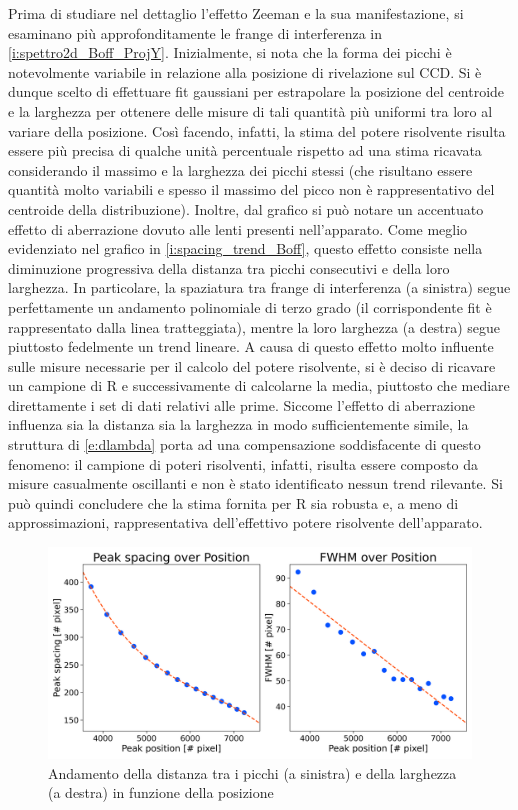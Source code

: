 \documentclass[twocolumn,10pt]{asme2ej}
\begin{document}
Prima di studiare nel dettaglio l'effetto Zeeman e la sua manifestazione, si esaminano più approfonditamente le frange
di interferenza in \autoref{i:spettro2d_Boff_ProjY}. Inizialmente, si nota che la forma dei picchi è notevolmente
variabile in relazione alla posizione di rivelazione sul CCD. Si è dunque scelto di effettuare fit gaussiani per
estrapolare la posizione del centroide e la larghezza per ottenere delle misure di tali quantità più uniformi tra loro
al variare della posizione. Così facendo, infatti, la stima del potere risolvente risulta essere più precisa di qualche
unità percentuale rispetto ad una stima ricavata considerando il massimo e la larghezza dei picchi stessi (che risultano
essere quantità molto variabili e spesso il massimo del picco non è rappresentativo del centroide della distribuzione).
Inoltre, dal grafico si può notare un accentuato effetto di aberrazione dovuto alle lenti presenti nell'apparato. Come
meglio evidenziato nel grafico in \autoref{i:spacing_trend_Boff}, questo effetto consiste nella diminuzione progressiva
della distanza tra picchi consecutivi e della loro larghezza. In particolare, la spaziatura tra frange di interferenza
(a sinistra) segue perfettamente un andamento polinomiale di terzo grado (il corrispondente fit è rappresentato dalla
linea tratteggiata), mentre la loro larghezza (a destra) segue piuttosto fedelmente un trend lineare. A causa di questo
effetto molto influente sulle misure necessarie per il calcolo del potere risolvente, si è deciso di ricavare un
campione di R e successivamente di calcolarne la media, piuttosto che mediare direttamente i set di dati relativi alle
prime. Siccome l'effetto di aberrazione influenza sia la distanza sia la larghezza in modo sufficientemente simile, la
struttura di \autoref{e:dlambda} porta ad una compensazione soddisfacente di questo fenomeno: il campione di poteri
risolventi, infatti, risulta essere composto da misure casualmente oscillanti e non è stato identificato nessun trend
rilevante. Si può quindi concludere che la stima fornita per R sia robusta e, a meno di approssimazioni, rappresentativa
dell'effettivo potere risolvente dell'apparato.

\begin{figure}
    \centering
    \includegraphics[width=\linewidth]{../Plots/Boff_spacing_trend.png}
    \caption{Andamento della distanza tra i picchi (a sinistra) e della larghezza (a destra) in funzione della posizione}
    \label{i:spacing_trend_Boff}
    \vspace{-10pt}
\end{figure}
\end{document}
